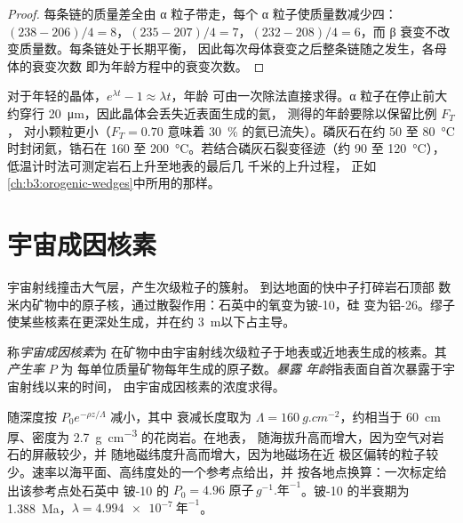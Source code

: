 \begin{proof}
每条链的质量差全由 α 粒子带走，每个 α 粒子使质量数减少四：
$(238 - 206)/4 = 8$，$(235 - 207)/4 = 7$，$(232 - 208)/4 = 6$，而 β
衰变不改变质量数。每条链处于长期平衡，
因此每次母体衰变之后整条链随之发生，各母体的衰变次数
即为年龄方程中的衰变次数。
\end{proof}

对于年轻的晶体，$e^{\lambda t} - 1 \approx \lambda t$，年龄
可由一次除法直接求得。α 粒子在停止前大约穿行
\qty{20}{\micro\metre}，因此晶体会丢失近表面生成的氦，
测得的年龄要除以保留比例 $F_T$，
对小颗粒更小（$F_T = 0.70$ 意味着 \qty{30}{\percent}
的氦已流失）。磷灰石在约 50 至 \qty{80}{\celsius} 时封闭氦，锆石在
160 至 \qty{200}{\celsius}。若结合磷灰石裂变径迹（约 90 至
\qty{120}{\celsius}），低温计时法可测定岩石上升至地表的最后几
千米的上升过程，
正如\cref{ch:b3:orogenic-wedges}中所用的那样。

\section{宇宙成因核素}\label{sec:b3:advanced-geochronology:cosmogenic}

宇宙射线撞击大气层，产生次级粒子的簇射。
到达地面的快中子打碎岩石顶部
数米内矿物中的原子核，通过散裂作用：石英中的氧变为铍-10，硅
变为铝-26。缪子使某些核素在更深处生成，并在约
\qty{3}{m}以下占主导。

\begin{definition}
\label{def:b3:advanced-geochronology:cosmogenic}
称\emph{宇宙成因核素}为
在矿物中由宇宙射线次级粒子于地表或近地表生成的核素。其
\emph{产生率} $P$ 为
每单位质量矿物每年生成的原子数。\emph{暴露
年龄}指表面自首次暴露于宇宙射线以来的时间，
由宇宙成因核素的浓度求得。
\end{definition}

随深度按 $P_0e^{-\rho z/\Lambda}$ 减小，其中
衰减长度取为 $\Lambda = \qty{160}{g.cm^{-2}}$，约相当于
\qty{60}{cm} 厚、密度为 \qty{2.7}{g.cm^{-3}} 的花岗岩。在地表，
随海拔升高而增大，因为空气对岩石的屏蔽较少，并
随地磁纬度升高而增大，因为地磁场在近
极区偏转的粒子较少。速率以海平面、高纬度处的一个参考点给出，并
按各地点换算：一次标定给出该参考点处石英中
铍-10 的 $P_0 = \num{4.96}\text{ 原子}\,\unit{g^{-1}.\text{年}^{-1}}$。铍-10 的半衰期为
\qty{1.388}{Ma}，$\lambda = \qty{4.994e-7}{\text{年}^{-1}}$。

